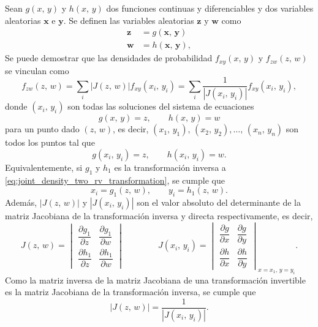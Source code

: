 \documentclass[a4paper]{report}
\newcommand{\x}{\mathbf{x}}
\newcommand{\y}{\mathbf{y}}
\newcommand{\w}{\mathbf{w}}
\newcommand{\z}{\mathbf{z}}
\begin{document}
Sean \(g(x,\,y)\) y \(h(x,\,y)\) dos funciones continuas y diferenciables y dos variables aleatorias \(\x\) e \(\y\). Se definen las variables aleatorias \(\z\) y \(\w\) como
\begin{align*}
 \z&=g(\x,\,\y)\\
 \w&=h(\x,\,\y),
\end{align*}
Se puede demostrar que las densidades de probabilidad \(f_{xy}(x,\,y)\) y \(f_{zw}(z,\,w)\) se vinculan como
\begin{equation}\label{eq:joint_density_two_funcions_two_rv}
 f_{zw}(z,\,w)=\sum_{i}|J(z,\,w)|f_{xy}(x_i,\,y_i)=\sum_{i}\frac{1}{|J(x_i,\,y_i)|}f_{xy}(x_i,\,y_i),
\end{equation}
donde \((x_i,\,y_i)\) son todas las soluciones del sistema de ecuaciones
\begin{equation}\label{eq:joint_density_two_rv_transformation}
 g(x,\,y)=z,\qquad h(x,\,y)=w
\end{equation}
para un punto dado \((z,\,w)\), es decir, \((x_1,\,y_1),\,(x_2,\,y_2),\dots,\,(x_n,\,y_n)\) son todos los puntos tal que
\[
 g(x_i,\,y_i)=z,\qquad h(x_i,\,y_i)=w.
\]
Equivalentemente, si \(g_1\) y \(h_1\) es la transformación inversa a \ref{eq:joint_density_two_rv_transformation}, se cumple que
\[
 x_i=g_1(z,\,w),\qquad y_i=h_1(z,\,w).
\]
Además, \(|J(z,\,w)|\) y \(|J(x_i,\,y_i)|\) son el valor absoluto del determinante de la matriz Jacobiana de la transformación inversa y directa respectivamente, es decir,
\begingroup
\renewcommand*{\arraystretch}{2.2}
\[
 J(z,\,w)=
 \begin{vmatrix}
    \dfrac{\partial g_1}{\partial z} & \dfrac{\partial g_1}{\partial w} \\
    \dfrac{\partial h_1}{\partial z} & \dfrac{\partial h_1}{\partial w}
\end{vmatrix}
\qquad\qquad
J(x_i,\,y_i)=
 \begin{vmatrix}
    \dfrac{\partial g}{\partial x} & \dfrac{\partial g}{\partial y} \\
    \dfrac{\partial h}{\partial x} & \dfrac{\partial h}{\partial y}
\end{vmatrix}_{x=x_1,\,y=y_i}.
\]
\endgroup
Como la matriz inversa de la matriz Jacobiana de una transformación invertible es la matriz Jacobiana de la transformación inversa, se cumple que
\[
 |J(z,\,w)|=\frac{1}{|J(x_i,\,y_i)|}.
\]
\end{document}
